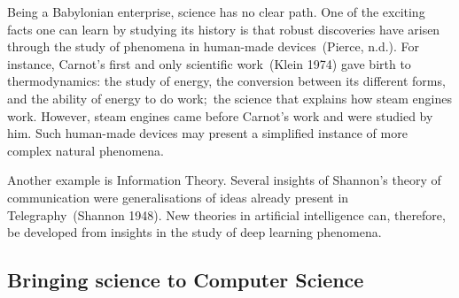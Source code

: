 \documentclass[
  letterpaper,
  a4paper,
  12pt,
  twoside,
  brazil,
  british,
  open=right]{scrbook}
\begin{document}
Being a Babylonian enterprise, science has no clear path. One of the
exciting facts one can learn by studying its history is that robust
discoveries have arisen through the study of phenomena in human-made
devices~(Pierce,
n.d.).
For instance, Carnot's first and only scientific work~(Klein
1974)
gave birth to thermodynamics: the study of energy, the conversion
between its different forms, and the ability of energy to do work;~the
science that explains how steam engines work. However, steam engines
came before Carnot's work and were studied by him. Such human-made
devices may present a simplified instance of more complex natural
phenomena.

Another example is Information Theory. Several insights of Shannon's
theory of communication were generalisations of ideas already present in
Telegraphy~(Shannon
1948).
New theories in artificial intelligence can, therefore, be developed
from insights in the study of deep learning phenomena.

\hypertarget{sec:bringing_science}{%
\subsection{Bringing science to Computer
Science}\label{sec:bringing_science}}
\end{document}

